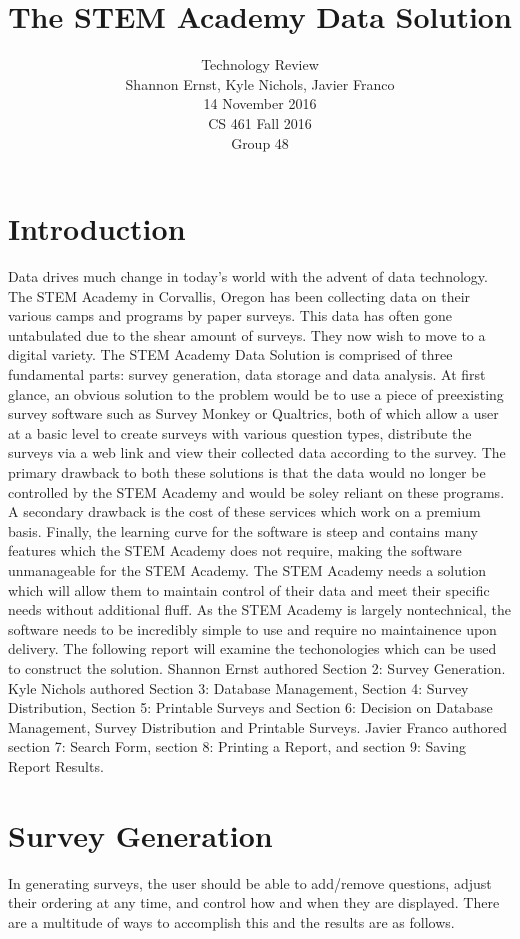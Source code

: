 \documentclass[letterpaper,10pt,serif, draftclsnofoot,onecolumn, compsoc, titlepage]{IEEEtran}
\title{The STEM Academy Data Solution}
\author{Technology Review \\ Shannon Ernst, Kyle Nichols, Javier Franco\\ 14 November 2016\\ CS 461 Fall 2016\\ Group 48}
\begin{document}
\maketitle
\begin{abstract}
\end{abstract}
\newpage
\section{Introduction}
Data drives much change in today's world with the advent of data technology. The STEM Academy in Corvallis,
 Oregon has been collecting data on their various camps and programs by paper surveys. This data has often 
gone untabulated due to the shear amount of surveys. They now wish to move to a digital variety.
 The STEM Academy Data Solution is comprised of three fundamental parts: survey generation, data storage and data analysis.
At first glance, an obvious solution to the problem would be to use a piece of preexisting survey software such as Survey Monkey \cite{surveyMonkey}
or Qualtrics\cite{qualtrics}, both of which allow a user at a basic level to create surveys with various question types, distribute the surveys 
via a web link and view their collected data according to the survey. The primary drawback to both these solutions is that the 
data would no longer be controlled by the STEM Academy and would be soley reliant on these programs. A secondary drawback
 is the cost of these services which work on a premium basis\cite{surveyMonkeyCost}. Finally, the learning curve for the software is steep and contains
many features which the STEM Academy does not require, making the software unmanageable for the STEM Academy. 
The STEM Academy needs a solution which will allow them to maintain control of their data and meet their specific needs without
additional fluff. As the STEM Academy is largely nontechnical, the software needs to be incredibly simple to use and require no 
maintainence upon delivery. The following report will examine the techonologies which can be used to construct the solution. Shannon Ernst authored Section 2: Survey Generation. Kyle Nichols authored Section 3: Database Management, Section 4: Survey Distribution, Section 5: Printable Surveys and Section 6: Decision on Database Management, Survey Distribution and Printable Surveys. Javier Franco authored section 7: Search Form, section 8: Printing a Report, and section 9: Saving Report Results. 
\section{Survey Generation}
In generating surveys, the user should be able to add/remove questions, adjust their ordering at any time, and control how 
and when they are displayed. There are a multitude of ways to accomplish this and the results are as follows. 
\end{document}
